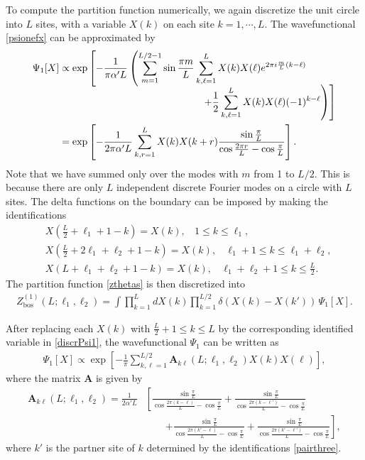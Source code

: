 \documentclass[12pt]{article}
\def\ie{\begin{equation}\begin{aligned}}
\def\fe{\end{aligned}\end{equation}}
\numberwithin{equation}{section}
\begin{document}
To compute the partition function numerically, we again discretize the unit circle into $L$ sites, with a variable $X(k)$ on each site $k=1,\cdots,L$. The wavefunctional \eqref{psionefx} can be approximated by
\ie \label{discrPsi1}
\Psi_1[X]&\propto\exp\left[- \frac{1}{\pi \alpha' L}\left(\sum_{m=1}^{L/2-1}\sin \frac{\pi m}{L}\sum_{k,\ell=1}^LX(k)X(\ell)e^{2\pi i \frac{m}{L}(k-\ell)}\right.\right.\\[-2mm]
&\hspace{5.0cm}\left.\left.+ \frac{1}{2}\sum_{k,\ell=1}^LX(k)X(\ell)(-1)^{k-\ell}\right)\right]\\
&=\exp\left[- \frac{1}{2\pi\alpha' L}\sum_{k,r=1}^LX(k)X(k+r)\frac{\sin \frac{\pi}{L}}{\cos \frac{2\pi r}{L}-\cos \frac{\pi}{L}}\right].
\fe
Note that we have summed only over the modes with $m$ from 1 to $L/2$. This is because there are only $L$ independent discrete Fourier modes on a circle with $L$ sites. The delta functions on the boundary can be imposed by making the identifications
\ie\label{pairthree}
& X(\tfrac{L}{2} + \ell_1+1 - k) = X(k),~~~~ 1\leq k \leq \ell_1,
\\
& X(\tfrac{L}{2} + 2 \ell_1 + \ell_2 +1 - k) = X(k),~~~~ \ell_1+1 \leq k \leq \ell_1 + \ell_2,
\\
& X(L+\ell_1 + \ell_2+1 - k) = X(k),~~~~ \ell_1+\ell_2+1 \leq k \leq \tfrac{L}{2}.
\fe
The partition function \eqref{zthetas} is then discretized into
\ie
Z_{\text{bos}}^{(1)}(L;\ell_1, \ell_2) = \int \prod_{k=1}^{L} dX(k)\prod_{k=1}^{L/2} \delta(X(k)-X(k'))\,\Psi_1[X].
\fe

After replacing each $X(k)$ with $\tfrac{L}{2}+1\leq k\leq L$ by the corresponding identified variable in \eqref{discrPsi1}, the wavefunctional $\Psi_1$ can be written as
\ie
\Psi_1[X]\propto \exp\left[ - \frac{1}{\pi}\sum_{k,\ell=1}^{L/2} \mathbf{A}_{k\ell}(L;\ell_1, \ell_2) X(k) X(\ell) \right],
\fe
where the matrix $\mathbf{A}$ is given by
\ie
\label{Amatrix}
\mathbf{A}_{k\ell}(L;\ell_1, \ell_2) = \frac{1}{2 \alpha' L}&\left[\frac{\sin \frac{\pi}{L}}{\cos \frac{2\pi (k-\ell)}{L}-\cos \frac{\pi}{L}}+\frac{\sin \frac{\pi}{L}}{\cos \frac{2\pi (k-\ell')}{L}-\cos \frac{\pi}{L}}\right.\\
&\qquad\left.+\frac{\sin \frac{\pi}{L}}{\cos \frac{2\pi (k'-\ell)}{L}-\cos \frac{\pi}{L}}+\frac{\sin \frac{\pi}{L}}{\cos \frac{2\pi (k'-\ell')}{L}-\cos \frac{\pi}{L}}\right],
\fe
where $k'$ is the partner site of $k$ determined by the identifications \eqref{pairthree}.
\end{document}

